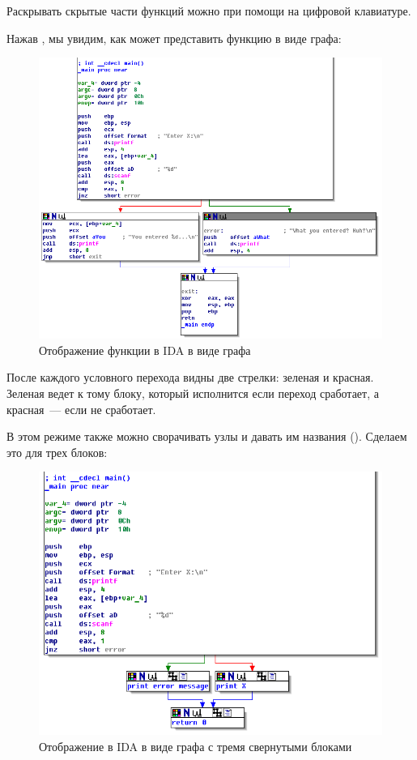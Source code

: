 

Раскрывать скрытые части функций можно при помощи \q{+} на цифровой клавиатуре.

\clearpage
Нажав , мы увидим, как \IDA может представить функцию в виде графа:

\begin{figure}[H]
\centering
\includegraphics[scale=\FigScale]{patterns/04_scanf/3_checking_retval/IDA.png}
\caption{Отображение функции в IDA в виде графа}
\label{fig:ex3_IDA_1}
\end{figure}

После каждого условного перехода видны две стрелки: зеленая и красная.
Зеленая ведет к тому блоку, который исполнится если переход сработает, 
а красная~--- если не сработает.

\clearpage
В этом режиме также можно сворачивать узлы и давать им названия ().
Сделаем это для трех блоков:

\begin{figure}[H]
\centering
\includegraphics[scale=\FigScale]{patterns/04_scanf/3_checking_retval/IDA2.png}
\caption{Отображение в IDA в виде графа с тремя свернутыми блоками}
\label{fig:ex3_IDA_2}
\end{figure}

